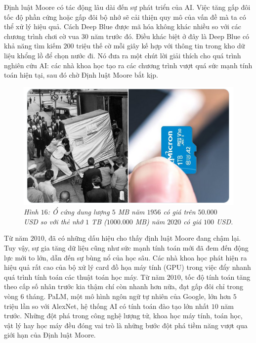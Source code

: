 \begin{multicols}{2}
	\vskip 0.1cm
	Định luật Moore có tác động lâu dài đến sự phát triển của AI. Việc tăng gấp đôi tốc độ phần cứng  hoặc gấp đôi bộ nhớ sẽ cải thiện quy mô của vấn đề mà ta có thể xử lý hiệu quả. Cách Deep Blue được mã hóa không khác nhiều so với các chương trình chơi cờ vua $30$ năm trước đó. Điều khác biệt ở đây là Deep Blue có khả năng tìm kiếm $200$ triệu thế cờ mỗi giây kế hợp với thông tin trong kho dữ liệu khổng lồ để chọn nước đi. Nó đưa ra một chút lời giải thích cho quá trình nghiên cứu AI: các nhà khoa học tạo ra các chương trình vượt quá sức mạnh tính toán hiện tại, sau đó chờ Định luật Moore bắt kịp.
	\begin{figure}[H]
		\vspace*{-5pt}
		\centering
		\captionsetup{labelformat= empty, justification=centering}
		\includegraphics[width= 1\linewidth]{Disk.png}
		\caption{\small\textit{\color{cackithi}Hình $16$: Ổ cứng dung lượng $5$ MB năm $1956$ có giá trên $50{.}000$ USD so với thẻ nhớ $1$ TB ($1000{.}000$ MB) năm $2020$ có giá $100$ USD.}}
		\vspace*{-10pt}
	\end{figure}
	Từ năm $2010$, đã có những dấu hiệu cho thấy định luật Moore đang chậm lại. Tuy vậy, sự gia tăng dữ liệu cũng như sức mạnh tính toán mới đã đem đến động lực mới to lớn, dẫn đến sự bùng nổ của học sâu. Các nhà khoa học phát hiện ra hiệu quả rất cao của bộ xử lý card đồ họa máy tính (GPU) trong việc đẩy nhanh quá trình tính toán các thuật toán học máy. Từ năm $2010$, tốc độ tính toán tăng theo cấp số nhân trước kia thậm chí còn nhanh hơn nữa, đạt gấp đôi chỉ trong vòng $6$ tháng. PaLM, một mô hình ngôn ngữ tự nhiên của Google, lớn hơn $5$ triệu lần so với AlexNet, hệ thống AI có tính toán đào tạo lớn nhất $10$ năm trước. Những đột phá trong công nghệ lượng tử, khoa học máy tính, toán học, vật lý hay học máy đều đóng vai trò là những bước đột phá tiềm năng vượt qua giới hạn của Định luật Moore.

\end{multicols}
